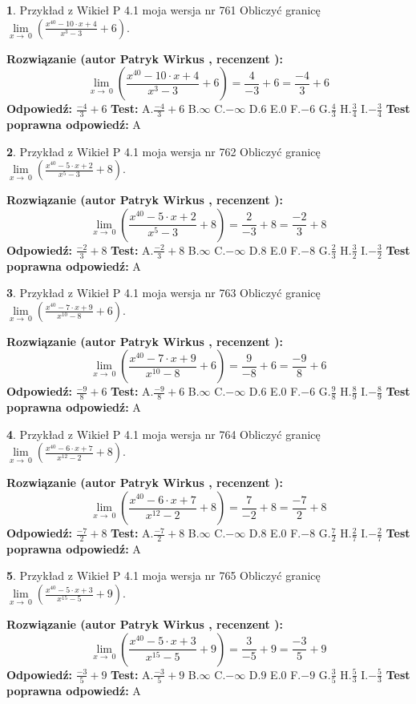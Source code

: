 \documentclass[12pt, a4paper]{article}
\theoremstyle{definition} %
\newtheorem{zad}{}
\newcommand{\zadStart}[1]{\begin{zad}#1\newline}
\newcommand{\zadStop}{\end{zad}}
\newcommand{\rozwStart}[2]{\noindent \textbf{Rozwiązanie (autor #1 , recenzent #2): }\newline}
\newcommand{\rozwStop}{\newline}
\newcommand{\odpStart}{\noindent \textbf{Odpowiedź:}\newline}
\newcommand{\odpStop}{\newline}
\newcommand{\testStart}{\noindent \textbf{Test:}\newline}
\newcommand{\testStop}{\newline}
\newcommand{\kluczStart}{\noindent \textbf{Test poprawna odpowiedź:}\newline}
\newcommand{\kluczStop}{\newline}
\begin{document}
\zadStart{Przykład z Wikieł P 4.1 moja wersja nr 761}
Obliczyć granicę $\lim\limits_{x\to\ 0}(\frac{x^{40}-10 \cdot x +4}{x^{3}-3}+6)$.
\zadStop
\rozwStart{Patryk Wirkus}{}
$$\lim\limits_{x\to\ 0}(\frac{x^{40}-10 \cdot x +4}{x^{3}-3}+6)=\frac{4}{-3}+6=\frac{-4}{3}+6$$
\rozwStop
\odpStart
$\frac{-4}{3}+6$
\odpStop
\testStart
A.$\frac{-4}{3}+6$
B.$\infty$
C.$-\infty$
D.$6$
E.$0$
F.$-6$
G.$\frac{4}{3}$
H.$\frac{3}{4}$
I.$-\frac{3}{4}$
\testStop
\kluczStart
A
\kluczStop



\zadStart{Przykład z Wikieł P 4.1 moja wersja nr 762}
Obliczyć granicę $\lim\limits_{x\to\ 0}(\frac{x^{40}-5 \cdot x +2}{x^{5}-3}+8)$.
\zadStop
\rozwStart{Patryk Wirkus}{}
$$\lim\limits_{x\to\ 0}(\frac{x^{40}-5 \cdot x +2}{x^{5}-3}+8)=\frac{2}{-3}+8=\frac{-2}{3}+8$$
\rozwStop
\odpStart
$\frac{-2}{3}+8$
\odpStop
\testStart
A.$\frac{-2}{3}+8$
B.$\infty$
C.$-\infty$
D.$8$
E.$0$
F.$-8$
G.$\frac{2}{3}$
H.$\frac{3}{2}$
I.$-\frac{3}{2}$
\testStop
\kluczStart
A
\kluczStop



\zadStart{Przykład z Wikieł P 4.1 moja wersja nr 763}
Obliczyć granicę $\lim\limits_{x\to\ 0}(\frac{x^{40}-7 \cdot x +9}{x^{10}-8}+6)$.
\zadStop
\rozwStart{Patryk Wirkus}{}
$$\lim\limits_{x\to\ 0}(\frac{x^{40}-7 \cdot x +9}{x^{10}-8}+6)=\frac{9}{-8}+6=\frac{-9}{8}+6$$
\rozwStop
\odpStart
$\frac{-9}{8}+6$
\odpStop
\testStart
A.$\frac{-9}{8}+6$
B.$\infty$
C.$-\infty$
D.$6$
E.$0$
F.$-6$
G.$\frac{9}{8}$
H.$\frac{8}{9}$
I.$-\frac{8}{9}$
\testStop
\kluczStart
A
\kluczStop



\zadStart{Przykład z Wikieł P 4.1 moja wersja nr 764}
Obliczyć granicę $\lim\limits_{x\to\ 0}(\frac{x^{40}-6 \cdot x +7}{x^{12}-2}+8)$.
\zadStop
\rozwStart{Patryk Wirkus}{}
$$\lim\limits_{x\to\ 0}(\frac{x^{40}-6 \cdot x +7}{x^{12}-2}+8)=\frac{7}{-2}+8=\frac{-7}{2}+8$$
\rozwStop
\odpStart
$\frac{-7}{2}+8$
\odpStop
\testStart
A.$\frac{-7}{2}+8$
B.$\infty$
C.$-\infty$
D.$8$
E.$0$
F.$-8$
G.$\frac{7}{2}$
H.$\frac{2}{7}$
I.$-\frac{2}{7}$
\testStop
\kluczStart
A
\kluczStop



\zadStart{Przykład z Wikieł P 4.1 moja wersja nr 765}
Obliczyć granicę $\lim\limits_{x\to\ 0}(\frac{x^{40}-5 \cdot x +3}{x^{15}-5}+9)$.
\zadStop
\rozwStart{Patryk Wirkus}{}
$$\lim\limits_{x\to\ 0}(\frac{x^{40}-5 \cdot x +3}{x^{15}-5}+9)=\frac{3}{-5}+9=\frac{-3}{5}+9$$
\rozwStop
\odpStart
$\frac{-3}{5}+9$
\odpStop
\testStart
A.$\frac{-3}{5}+9$
B.$\infty$
C.$-\infty$
D.$9$
E.$0$
F.$-9$
G.$\frac{3}{5}$
H.$\frac{5}{3}$
I.$-\frac{5}{3}$
\testStop
\kluczStart
A
\kluczStop
\end{document}
